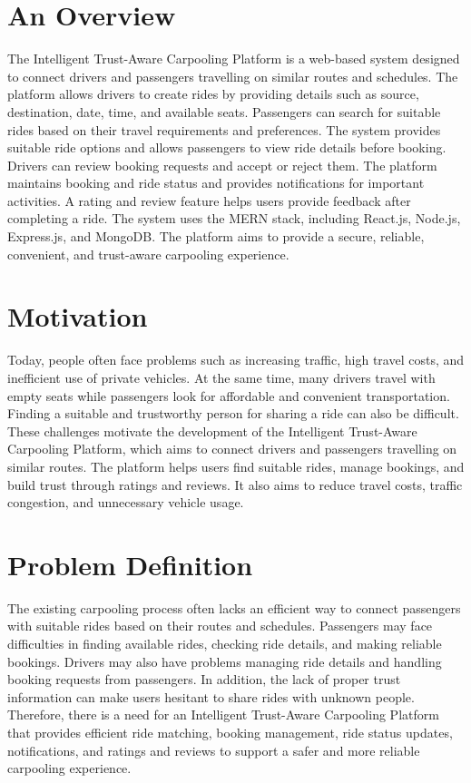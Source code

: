 \documentclass[12pt,a4paper,oneside]{report}
\begin{document}
\section{An Overview}
The Intelligent Trust-Aware Carpooling Platform is a web-based system designed
to connect drivers and passengers travelling on similar routes and schedules.
The platform allows drivers to create rides by providing details such as
source, destination, date, time, and available seats. Passengers can search for
suitable rides based on their travel requirements and preferences. The system
provides suitable ride options and allows passengers to view ride details
before booking. Drivers can review booking requests and accept or reject them.
The platform maintains booking and ride status and provides notifications for
important activities. A rating and review feature helps users provide feedback
after completing a ride. The system uses the MERN stack, including React.js,
Node.js, Express.js, and MongoDB. The platform aims to provide a secure,
reliable, convenient, and trust-aware carpooling experience.

\section{Motivation}
Today, people often face problems such as increasing traffic, high travel
costs, and inefficient use of private vehicles. At the same time, many drivers
travel with empty seats while passengers look for affordable and convenient
transportation. Finding a suitable and trustworthy person for sharing a ride
can also be difficult. These challenges motivate the development of the
Intelligent Trust-Aware Carpooling Platform, which aims to connect drivers and
passengers travelling on similar routes. The platform helps users find
suitable rides, manage bookings, and build trust through ratings and reviews.
It also aims to reduce travel costs, traffic congestion, and unnecessary
vehicle usage.

\section{Problem Definition}
The existing carpooling process often lacks an efficient way to connect
passengers with suitable rides based on their routes and schedules. Passengers
may face difficulties in finding available rides, checking ride details, and
making reliable bookings. Drivers may also have problems managing ride details
and handling booking requests from passengers. In addition, the lack of proper
trust information can make users hesitant to share rides with unknown people.
Therefore, there is a need for an Intelligent Trust-Aware Carpooling Platform
that provides efficient ride matching, booking management, ride status
updates, notifications, and ratings and reviews to support a safer and more
reliable carpooling experience.
\end{document}
